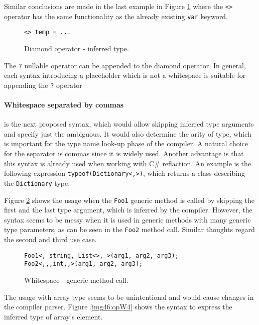 \par
Similar conclusions are made in the last example in Figure \ref{img44:opDi5} where the \texttt{<>} operator has the same functionality as the already existing \texttt{var} keyword.
\begin{figure}[h!]
\begin{lstlisting}[style=csharp]
<> temp = ...
\end{lstlisting}
\caption{Diamond operator - inferred type.}
\label{img44:opDi5}
\end{figure}
\par
The \texttt{?} nullable operator can be appended to the diamond operator.
In general, each syntax introducing a placeholder which is not a whitespace is suitable for appending the \texttt{?} operator

\paragraph*{Whitespace separated by commas} is the next proposed syntax, which would allow skipping inferred type arguments and specify just the ambiguous. 
It would also determine the arity of type, which is important for the type name look-up phase of the compiler. 
A natural choice for the separator is commas since it is widely used. 
Another advantage is that this syntax is already used when working with C\# reflaction. 
An example is the following expression \texttt{typeof(Dictionary<,>)}, which returns a class describing the \texttt{Dictionary} type.
\par
Figure \ref{img45:opW1} shows the usage when the \texttt{Foo1} generic method is called by
skipping the first and the last type argument, which is inferred by the compiler. 
However, the syntax seems to be messy when it is used in generic methods with many generic type parameters, as can be seen in the \texttt{Foo2} method call. 
Similar thoughts regard the second and third use case.
\begin{figure}[h]
\begin{lstlisting}[style=csharp]
Foo1<, string, List<>, >(arg1, arg2, arg3);
Foo2<,,,int,,>(arg1, arg2, arg3);
\end{lstlisting}
\caption{Whitespace - generic method call.}
\label{img45:opW1}
\end{figure}
\par
The usage with array type seems to be unintentional and would cause changes in the compiler parser. 
Figure \ref{img46:opW4} shows the syntax to express the inferred type of array's element.
